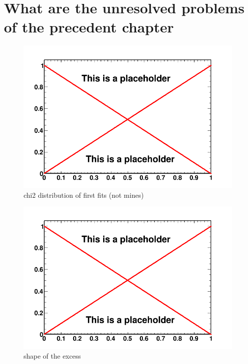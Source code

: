\section{What are the unresolved problems of the precedent chapter}
%	
%
\begin{figure}
 \centering
 \includegraphics[width=.9\linewidth]{pic/dummy.png}
 \caption{chi2 distribution of first fits (not mines)}
 \label{fig:first_BKGonly_fits}
\end{figure}



\begin{figure}
 \centering
 \includegraphics[width=.9\linewidth]{pic/dummy.png}
 \caption{shape of the excess}
 \label{fig:first_BKGonly_fits}
\end{figure}

